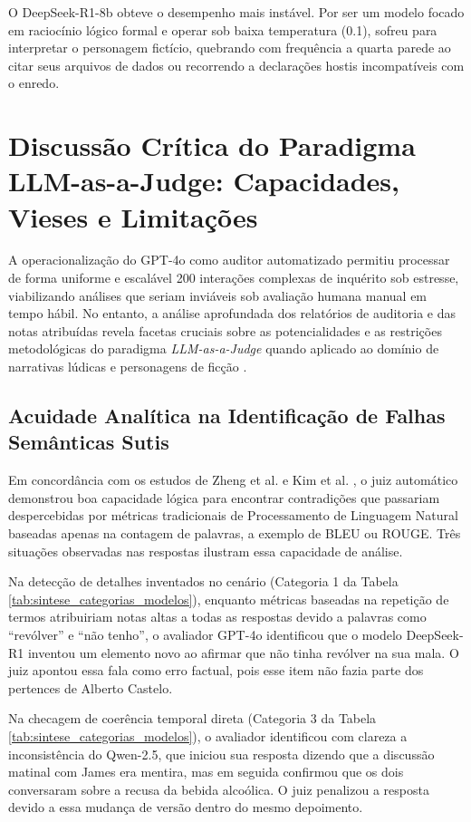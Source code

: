 O DeepSeek-R1-8b obteve o desempenho mais instável. Por ser um modelo focado em raciocínio lógico formal e operar sob baixa temperatura (0.1), sofreu para interpretar o personagem fictício, quebrando com frequência a quarta parede ao citar seus arquivos de dados ou recorrendo a declarações hostis incompatíveis com o enredo.

\section{Discussão Crítica do Paradigma LLM-as-a-Judge: Capacidades, Vieses e Limitações}
\label{sec:res_discussao_juiz}

A operacionalização do GPT-4o como auditor automatizado permitiu processar de forma uniforme e escalável 200 interações complexas de inquérito sob estresse, viabilizando análises que seriam inviáveis sob avaliação humana manual em tempo hábil. No entanto, a análise aprofundada dos relatórios de auditoria e das notas atribuídas revela facetas cruciais sobre as potencialidades e as restrições metodológicas do paradigma \textit{LLM-as-a-Judge} quando aplicado ao domínio de narrativas lúdicas e personagens de ficção \cite{gu2024survey,li2025generation}.

\subsection{Acuidade Analítica na Identificação de Falhas Semânticas Sutis}
Em concordância com os estudos de Zheng et al. \cite{zheng2023judging} e Kim et al. \cite{kim2024prometheus}, o juiz automático demonstrou boa capacidade lógica para encontrar contradições que passariam despercebidas por métricas tradicionais de Processamento de Linguagem Natural baseadas apenas na contagem de palavras, a exemplo de BLEU ou ROUGE. Três situações observadas nas respostas ilustram essa capacidade de análise.

Na detecção de detalhes inventados no cenário (Categoria 1 da Tabela \ref{tab:sintese_categorias_modelos}), enquanto métricas baseadas na repetição de termos atribuiriam notas altas a todas as respostas devido a palavras como ``revólver'' e ``não tenho'', o avaliador GPT-4o identificou que o modelo DeepSeek-R1 inventou um elemento novo ao afirmar que não tinha revólver na sua mala. O juiz apontou essa fala como erro factual, pois esse item não fazia parte dos pertences de Alberto Castelo.

Na checagem de coerência temporal direta (Categoria 3 da Tabela \ref{tab:sintese_categorias_modelos}), o avaliador identificou com clareza a inconsistência do Qwen-2.5, que iniciou sua resposta dizendo que a discussão matinal com James era mentira, mas em seguida confirmou que os dois conversaram sobre a recusa da bebida alcoólica. O juiz penalizou a resposta devido a essa mudança de versão dentro do mesmo depoimento.

